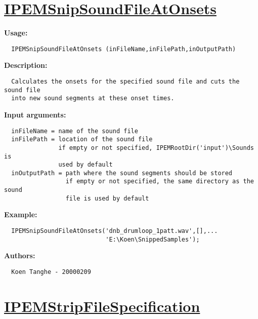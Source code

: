 \newpage
\section*{\hyperlink{Concepts:IPEMSnipSoundFileAtOnsets}{IPEMSnipSoundFileAtOnsets}}
\hypertarget{FuncRef:IPEMSnipSoundFileAtOnsets}{}

\textbf{Usage:}
\begin{verbatim}  IPEMSnipSoundFileAtOnsets (inFileName,inFilePath,inOutputPath)

\end{verbatim}
\textbf{Description:}
\begin{verbatim}  Calculates the onsets for the specified sound file and cuts the sound file
  into new sound segments at these onset times.

\end{verbatim}
\textbf{Input arguments:}
\begin{verbatim}  inFileName = name of the sound file
  inFilePath = location of the sound file
               if empty or not specified, IPEMRootDir('input')\Sounds is
               used by default
  inOutputPath = path where the sound segments should be stored
                 if empty or not specified, the same directory as the sound
                 file is used by default

\end{verbatim}
\textbf{Example:}
\begin{verbatim}  IPEMSnipSoundFileAtOnsets('dnb_drumloop_1patt.wav',[],...
                            'E:\Koen\SnippedSamples');

\end{verbatim}
\textbf{Authors:}
\begin{verbatim}  Koen Tanghe - 20000209
\end{verbatim}


\newpage
\section*{\hyperlink{Concepts:IPEMStripFileSpecification}{IPEMStripFileSpecification}}
\hypertarget{FuncRef:IPEMStripFileSpecification}{}

